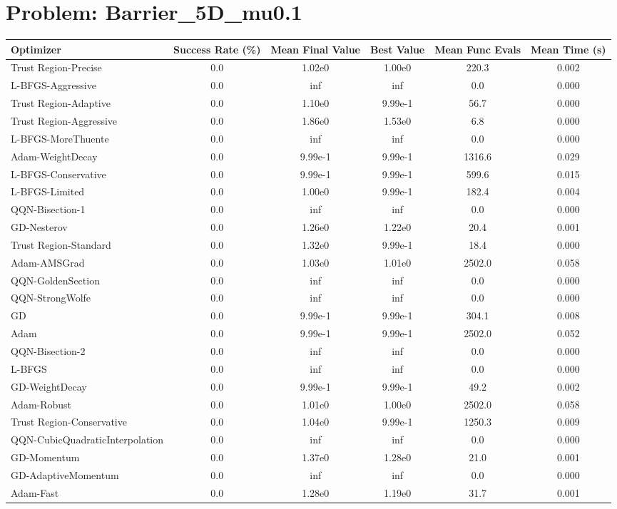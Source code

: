 \documentclass{article}
\begin{document}
\section{Problem: Barrier\_5D\_mu0.1}
\begin{longtable}{p{3cm}*{5}{c}}
\toprule
\textbf{Optimizer} & \textbf{Success Rate (\%)} & \textbf{Mean Final Value} & \textbf{Best Value} & \textbf{Mean Func Evals} & \textbf{Mean Time (s)} \\
\midrule
Trust Region-Precise & 0.0 & 1.02e0 & 1.00e0 & 220.3 & 0.002 \\
L-BFGS-Aggressive & 0.0 & inf & inf & 0.0 & 0.000 \\
Trust Region-Adaptive & 0.0 & 1.10e0 & 9.99e-1 & 56.7 & 0.000 \\
Trust Region-Aggressive & 0.0 & 1.86e0 & 1.53e0 & 6.8 & 0.000 \\
L-BFGS-MoreThuente & 0.0 & inf & inf & 0.0 & 0.000 \\
Adam-WeightDecay & 0.0 & 9.99e-1 & 9.99e-1 & 1316.6 & 0.029 \\
L-BFGS-Conservative & 0.0 & 9.99e-1 & 9.99e-1 & 599.6 & 0.015 \\
L-BFGS-Limited & 0.0 & 1.00e0 & 9.99e-1 & 182.4 & 0.004 \\
QQN-Bisection-1 & 0.0 & inf & inf & 0.0 & 0.000 \\
GD-Nesterov & 0.0 & 1.26e0 & 1.22e0 & 20.4 & 0.001 \\
Trust Region-Standard & 0.0 & 1.32e0 & 9.99e-1 & 18.4 & 0.000 \\
Adam-AMSGrad & 0.0 & 1.03e0 & 1.01e0 & 2502.0 & 0.058 \\
QQN-GoldenSection & 0.0 & inf & inf & 0.0 & 0.000 \\
QQN-StrongWolfe & 0.0 & inf & inf & 0.0 & 0.000 \\
GD & 0.0 & 9.99e-1 & 9.99e-1 & 304.1 & 0.008 \\
Adam & 0.0 & 9.99e-1 & 9.99e-1 & 2502.0 & 0.052 \\
QQN-Bisection-2 & 0.0 & inf & inf & 0.0 & 0.000 \\
L-BFGS & 0.0 & inf & inf & 0.0 & 0.000 \\
GD-WeightDecay & 0.0 & 9.99e-1 & 9.99e-1 & 49.2 & 0.002 \\
Adam-Robust & 0.0 & 1.01e0 & 1.00e0 & 2502.0 & 0.058 \\
Trust Region-Conservative & 0.0 & 1.04e0 & 9.99e-1 & 1250.3 & 0.009 \\
QQN-CubicQuadraticInterpolation & 0.0 & inf & inf & 0.0 & 0.000 \\
GD-Momentum & 0.0 & 1.37e0 & 1.28e0 & 21.0 & 0.001 \\
GD-AdaptiveMomentum & 0.0 & inf & inf & 0.0 & 0.000 \\
Adam-Fast & 0.0 & 1.28e0 & 1.19e0 & 31.7 & 0.001 \\
\bottomrule
\end{longtable}
\end{document}
